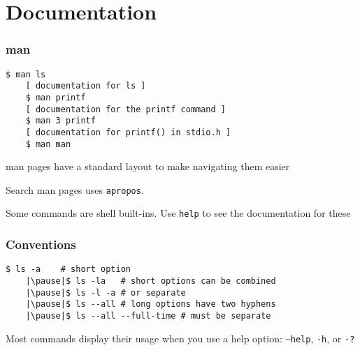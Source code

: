 \documentclass[%
        hyperref={%
                pdfauthor={Zakariyya Mughal},%
                pdfpagemode={None},pdfpagelayout={SinglePage}}%
        xcolor={x11names},%
]{beamer}
\begin{document}
\section{Documentation}\frame{\insertsection}
\begin{frame}[fragile]
	\frametitle{man}
	\begin{lstlisting}[escapeinside=||]
	$ man ls
	[ documentation for ls ]
	$ man printf
	[ documentation for the printf command ]
	$ man 3 printf
	[ documentation for printf() in stdio.h ]
	$ man man
	\end{lstlisting}
	\pause
	man pages have a standard layout to make navigating them
	easier

	\pause Search man pages uses \texttt{apropos}.

	\pause Some commands are shell built-ins. Use \texttt{help} to
	see the documentation for these
\end{frame}
\begin{frame}[fragile]
	\frametitle{Conventions}
	\begin{lstlisting}[escapeinside=||]
	$ ls -a    # short option
	|\pause|$ ls -la   # short options can be combined
	|\pause|$ ls -l -a # or separate
	|\pause|$ ls --all # long options have two hyphens
	|\pause|$ ls --all --full-time # must be separate
	\end{lstlisting}

	Most commands display their usage when you use a help
	option: \texttt{--help}, \texttt{-h}, or \texttt{-?}
\end{frame}
\end{document}
